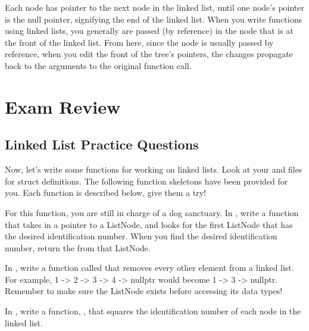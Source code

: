 \documentclass{tufte-handout}
\begin{document}
Each node has pointer to the next node in the linked list, until one node's pointer is the null pointer, signifying the end of the linked list.
When you write functions using linked lists, you generally are passed (by reference) in the node that is at the front of the linked list.
From here, since the node is usually passed by reference, when you edit the front of the tree's pointers, the changes propagate back to the arguments to the original function call.

\section{Exam Review}
\subsection{Linked List Practice Questions}

Now, let's write some functions for working on linked lists.
Look at your  and  files for struct definitions.
The following function skeletons have been provided for you. Each function is described below, give them a try!

\medskip \noindent
\textbf{}
\medskip

\noindent For this function, you are still in charge of a dog sanctuary. 
In , write a function  that takes in a pointer to a ListNode, and looks for the first ListNode that has the desired identification number.
When you find the desired identification number, return the  from that ListNode.

\medskip \noindent
\textbf{}
\medskip

\noindent In , write a function called  that removes every other element from a linked list.  
For example, 1 -> 2 -> 3 -> 4 -> nullptr would become 1 -> 3 -> nullptr.  
Remember to make sure the ListNode exists before accessing its data types!

\medskip \noindent
\textbf{}
\medskip

\noindent In , write a function, , that squares the identification number of each node in the linked list.
\end{document}
